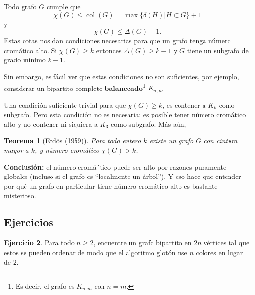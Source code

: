 \documentclass[12pt]{report}
\theoremstyle{plain}
\newtheorem{theorem}{Teorema}[section]
\theoremstyle{definition}
\newtheorem{exercise}[theorem]{Ejercicio}
\newcommand{\col}[1]{\operatorname{col} (#1)}
\begin{document}
Todo grafo $G$ cumple que
\[
    \chi (G) \leq \col{G} = \max \{ \delta(H) | H \subset G \} +1
\]
y
\[
    \chi (G) \leq \Delta (G) + 1.
\]
Estas cotas nos dan condiciones \underline{necesarias} para que un grafo tenga número cromático alto. Si $\chi (G) \geq k$ entonces $\Delta (G) \geq k -1$ y $G$ tiene un subgrafo de grado mínimo $k-1$.

Sin embargo, es fácil ver que estas condiciones no son \underline{suficientes}, por ejemplo, considerar un bipartito completo \textbf{balanceado}\footnote{Es decir, el grafo es $K_{n,m}$ con $n = m$.} $K_{n,n}$.

Una condición suficiente trivial para que $\chi (G) \geq k$, es contener a $K_k$ como subgrafo. Pero esta condición no es necesaria: es posible tener número cromático alto y no contener ni siquiera a $K_3$ como subgrafo. Más aún,

\begin{theorem}[Erdös (1959)]
Para todo entero $k$ existe un grafo $G$ con cintura mayor a $k$, y número cromático $\chi (G) > k$.
\end{theorem}

\textbf{Conclusión:} el número cromá´tico puede ser alto por razones puramente globales (incluso si el grafo es ``localmente un árbol''). Y eso hace que entender por qué un grafo en particular tiene número cromático alto es bastante misterioso.



\subsection{Ejercicios}

\begin{exercise}
Para todo $n \geq 2$, encuentre un grafo bipartito en $2n$ vértices tal que estos se pueden ordenar de modo que el algoritmo glotón use $n$ colores en lugar de $2$.
\end{exercise}
\end{document}
